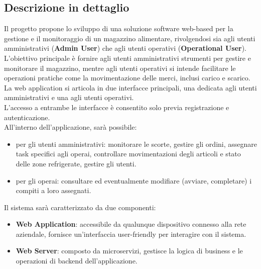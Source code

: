 \subsection{Descrizione in dettaglio}

Il progetto propone lo sviluppo di una soluzione software web-based per la gestione e il monitoraggio di un magazzino
alimentare, rivolgendosi sia agli utenti amministrativi (\textbf{Admin User}) che agli utenti operativi (\textbf{Operational User}).\\
L'obiettivo principale è fornire agli utenti amministrativi strumenti per gestire e monitorare il magazzino,
mentre agli utenti operativi si intende facilitare le operazioni pratiche come la movimentazione delle merci, inclusi carico e scarico.\\
La web application si articola in due interfacce principali, una dedicata agli utenti amministrativi e una agli utenti operativi.\\
L'accesso a entrambe le interfacce è consentito solo previa registrazione e autenticazione.\\
All'interno dell'applicazione, sarà possibile:
\begin{itemize}
    \item per gli utenti amministrativi: monitorare le scorte, gestire gli ordini, assegnare task specifici agli operai, controllare movimentazioni degli articoli e stato delle zone refrigerate, gestire gli utenti.
    \item per gli operai: consultare ed eventualmente modifiare (avviare, completare) i compiti a loro assegnati.
\end{itemize}

Il sistema sarà caratterizzato da due componenti:
\begin{itemize}
    \item \textbf{Web Application}: accessibile da qualunque dispositivo connesso alla rete aziendale, fornisce un'interfaccia user-friendly per interagire con il sistema.
    \item \textbf{Web Server}: composto da microservizi, gestisce la logica di business e le operazioni di backend dell'applicazione.
\end{itemize}
\newpage